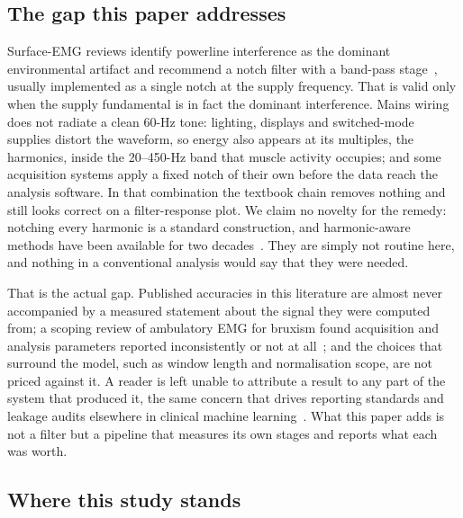 \documentclass[pdflatex,sn-nature,iicol]{sn-jnl}
\begin{document}
\subsection{The gap this paper addresses}
\label{sec:gap}

Surface-EMG reviews identify powerline interference as the dominant environmental artifact and recommend a notch filter with a band-pass stage~\cite{chowdhury2013surface,raez2006techniques}, usually implemented as a single notch at the supply frequency. That is valid only when the supply fundamental is in fact the dominant interference. Mains wiring does not radiate a clean 60-Hz tone: lighting, displays and switched-mode supplies distort the waveform, so energy also appears at its multiples, the harmonics, inside the 20--450-Hz band that muscle activity occupies; and some acquisition systems apply a fixed notch of their own before the data reach the analysis software. In that combination the textbook chain removes nothing and still looks correct on a filter-response plot. We claim no novelty for the remedy: notching every harmonic is a standard construction, and harmonic-aware methods have been available for two decades~\cite{mewett2004reducing,levkov2005removal,keshtkaran2014fast,sornmo2005bioelectrical}. They are simply not routine here, and nothing in a conventional analysis would say that they were needed.

That is the actual gap. Published accuracies in this literature are almost never accompanied by a measured statement about the signal they were computed from; a scoping review of ambulatory EMG for bruxism found acquisition and analysis parameters reported inconsistently or not at all~\cite{thymi2021signal}; and the choices that surround the model, such as window length and normalisation scope, are not priced against it. A reader is left unable to attribute a result to any part of the system that produced it, the same concern that drives reporting standards and leakage audits elsewhere in clinical machine learning~\cite{collins2024tripod,kapoor2023leakage,varoquaux2022machine,pineau2021improving}. What this paper adds is not a filter but a pipeline that measures its own stages and reports what each was worth.

\subsection{Where this study stands}
\label{sec:positioning}
\end{document}
